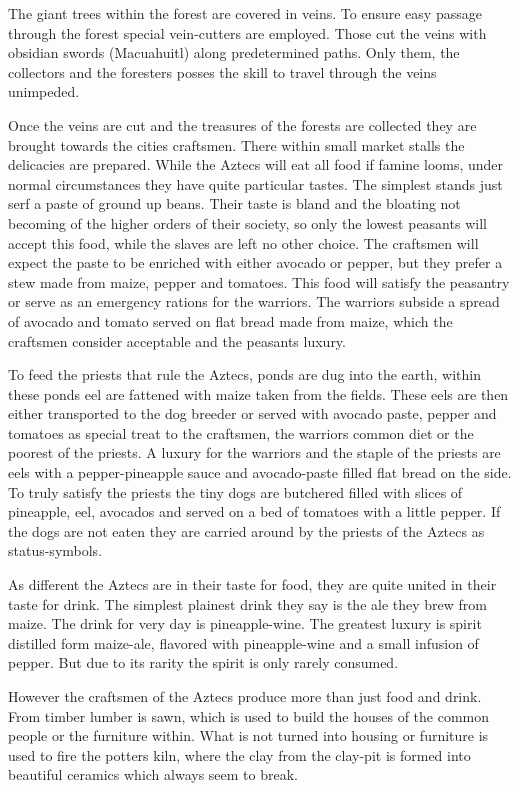 \documentclass[a4paper]{book}
\begin{document}
	The giant trees within the forest are covered in veins.
	To ensure easy passage through the forest special vein-cutters are employed.
	Those cut the veins with obsidian swords (Macuahuitl) along predetermined paths.
	Only them, the collectors and the foresters posses the skill to travel through the veins unimpeded.

	Once the veins are cut and the treasures of the forests are collected they are
	brought towards the cities craftsmen.
	There within small market stalls the delicacies are prepared.
	While the \gls{Aztecs} will eat all food if famine looms,
	under normal circumstances they have quite particular tastes.
	The simplest stands just serf a paste of ground up beans.
	Their taste is bland and the bloating not becoming of the higher orders of their society,
	so only the lowest peasants will accept this food,
	while the slaves are left no other choice.
	The craftsmen will expect the paste to be enriched with either avocado or pepper,
	but they prefer a stew made from maize, pepper and tomatoes.
	This food will satisfy the peasantry or serve as an emergency rations for the warriors.
	The warriors subside a spread of avocado and tomato served on flat bread made from maize,
	which the craftsmen consider acceptable and the peasants luxury.

	To feed the priests that rule the \gls{Aztecs},
	ponds are dug into the earth,
	within these ponds eel are fattened with maize taken from the fields.
	These eels are then either transported to the dog breeder or
	served with avocado paste, pepper and tomatoes as special treat to the craftsmen,
	the warriors common diet or the poorest of the priests.
	A luxury for the warriors and the staple of the priests are eels with a pepper-pineapple sauce
	and avocado-paste filled flat bread on the side.
	To truly satisfy the priests the tiny dogs are butchered filled with slices of pineapple,
	eel, avocados and served on a bed of tomatoes with a little pepper.
	If the dogs are not eaten they are carried around by the priests of the \gls{Aztecs}
	as status-symbols.

	As different the \gls{Aztecs} are in their taste for food,
	they are quite united in their taste for drink.
	The simplest plainest drink they say is the ale they brew from maize.
	The drink for very day is pineapple-wine.
	The greatest luxury is spirit distilled form maize-ale, flavored with pineapple-wine
	and a small infusion of pepper.
	But due to its rarity the spirit is only rarely consumed.

	However the craftsmen of the \gls{Aztecs} produce more than just food and drink.
	From timber lumber is sawn, which is used to build the houses of the common people
	or the furniture within.
	What is not turned into housing or furniture is used to fire the potters kiln,
	where the clay from the clay-pit is formed into beautiful ceramics which always seem to break.
\end{document}
